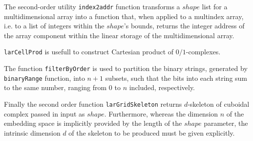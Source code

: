 \documentclass{article}
\begin{document}
The second-order utility \texttt{index2addr} function transforms a $shape$ list for a multidimensional array into a function that, when applied
to a multindex array, i.e. to a list of integers within the $shape$'s bounds, returns the integer address of the array component within the linear storage of the multidimensional array. 

\texttt{larCellProd} is usefull to construct Cartesian product of $0/1$-complexes.

The function \texttt{filterByOrder} is used to partition the binary strings, generated by \texttt{binaryRange} function, into $n + 1$
subsets, such that the bits into each string sum to the same number, ranging from $0$ to $n$ included, respectively.

Finally the second order function \texttt{larGridSkeleton} returns $d$-skeleton of cuboidal complex passed in input as $shape$. Furthermore, whereas the dimension $n$ of the embedding space is implicitly provided by the length of the $shape$ parameter, the intrinsic dimension $d$ of the skeleton to be produced must be given explicitly.
\vspace{2ex}
\end{document}
